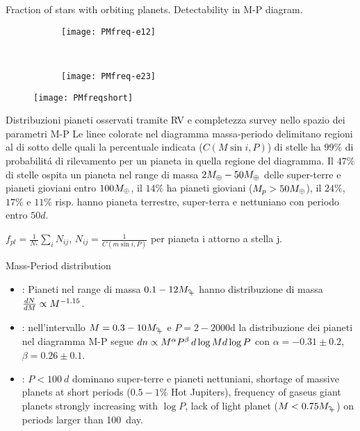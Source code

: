 \begin{frame}{Fraction of stars with orbiting planets. Detectability in M-P diagram.}

\begin{figure}[!ht]
\begin{subfigure}[b]{0.47\textwidth}
\centering
\texttt{[image: PMfreq-e12]}
\label{fig:PMfreq-e12}
\end{subfigure} 
~
\begin{subfigure}[b]{0.47\textwidth}
\centering
\texttt{[image: PMfreq-e23]}
\label{fig:PMfreq-e23}
\end{subfigure}

\end{figure} 

\begin{figure}[!ht]
\texttt{[image: PMfreqshort]}
\label{fig:PMfreqshort}
\end{figure}

\end{frame}

\begin{wordonframe}{Distribuzioni pianeti osservati tramite RV e completezza survey nello spazio dei parametri M-P}
Le linee colorate nel diagramma massa-periodo delimitano regioni al di sotto delle quali la percentuale indicata ($C(M\sin{i},P)$) di stelle ha $99\%$ di probabilit\'a di rilevamento per un pianeta in quella regione del diagramma.
Il $47\%$ di stelle ospita un pianeta nel range di massa $2\mearth{}-50\mearth{}$ delle super-terre e pianeti gioviani entro $100\mearth{}$, il $14\%$ ha pianeti gioviani ($M_p>50\mearth{}$), il $24\%$, $17\%$ e $11\%$ risp. hanno pianeta terrestre, super-terra e nettuniano con periodo entro $50d$.

$f_{pl}=\frac{1}{N_*}\sum_iN_{ij}$, $N_{ij}=\frac{1}{C(m\sin{i},P)}$ per pianeta i attorno a stella j.
\end{wordonframe}

\begin{frame}{Mass-Period distribution}
\begin{itemize}
\item \cite{marcy2008exoplanet}: Pianeti nel range di massa $0.1-12\mjupiter$ hanno distribuzione di massa $\TDy{M}{N}\propto M\expy{-1.15}$.
\item \cite{cumming2008keck}: nell'intervallo $M=0.3-10\mjupiter{}$ e $P=2-2000\si{\day}$ la distribuzione dei pianeti nel diagramma M-P segue $dn\propto M\expy{\alpha}P\expy{\beta}\,d\log{M}d\log{P}$ con $\alpha=-0.31\pm0.2$, $\beta=0.26\pm0.1$.
\item \cite{mayor2011harps}: $P<\SI{100}{d}$ dominano super-terre e pianeti nettuniani, shortage of massive planets at short periods ($0.5-1\%$ Hot Jupiters), frequency of gaseus giant planets strongly increasing with $\log{P}$, lack of light planet ($M<0.75\mjupiter{}$) on periods larger than \SI{100}{day}.
\end{itemize}
\end{frame}

